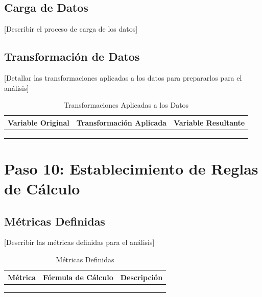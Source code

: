 \documentclass[12pt,letterpaper]{report}
\begin{document}
\subsection{Carga de Datos}
[Describir el proceso de carga de los datos]

\subsection{Transformación de Datos}
[Detallar las transformaciones aplicadas a los datos para prepararlos para el análisis]

\begin{table}[H]
    \centering
    \begin{tabularx}{\textwidth}{|X|X|X|}
        \hline
        \textbf{Variable Original} & \textbf{Transformación Aplicada} & \textbf{Variable Resultante} \\
        \hline
        & & \\
        \hline
        & & \\
        \hline
        & & \\
        \hline
    \end{tabularx}
    \caption{Transformaciones Aplicadas a los Datos}
\end{table}

\section{Paso 10: Establecimiento de Reglas de Cálculo}

\subsection{Métricas Definidas}
[Describir las métricas definidas para el análisis]

\begin{table}[H]
    \centering
    \begin{tabularx}{\textwidth}{|X|X|X|}
        \hline
        \textbf{Métrica} & \textbf{Fórmula de Cálculo} & \textbf{Descripción} \\
        \hline
        & & \\
        \hline
        & & \\
        \hline
        & & \\
        \hline
    \end{tabularx}
    \caption{Métricas Definidas}
\end{table}
\end{document}
